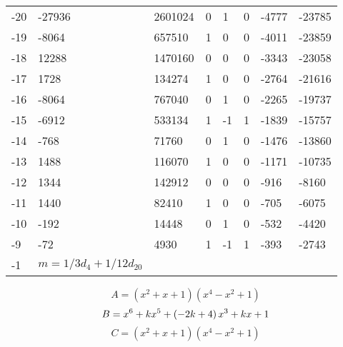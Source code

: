 \documentclass{amsart}
\begin{document}
\begin{longtable}{|l|l|l|lllll|}
-20&-27936&2601024&0&1&0&-4777&-23785\\
-19&-8064&657510&1&0&0&-4011&-23859\\
-18&12288&1470160&0&0&0&-3343&-23058\\
-17&1728&134274&1&0&0&-2764&-21616\\
-16&-8064&767040&0&1&0&-2265&-19737\\
-15&-6912&533134&1&-1&1&-1839&-15757\\
-14&-768&71760&0&1&0&-1476&-13860\\
-13&1488&116070&1&0&0&-1171&-10735\\
-12&1344&142912&0&0&0&-916&-8160\\
-11&1440&82410&1&0&0&-705&-6075\\
-10&-192&14448&0&1&0&-532&-4420\\
-9&-72&4930&1&-1&1&-393&-2743\\
-1&$m=1/3d_{4}+1/12d_{20}$&&\multicolumn{5}{c|}{}\\
\hline
\end{longtable}
$$A=(x^2
 + x
 + 1)(x^4
 - x^2
 + 1)$$
$$B=x^6
 + k\*x^5
 + \left(-2\*k
 + 4\right) \*x^3
 + k\*x
 + 1$$
$$C=(x^2
 + x
 + 1)(x^4
 - x^2
 + 1)$$
\end{document}

